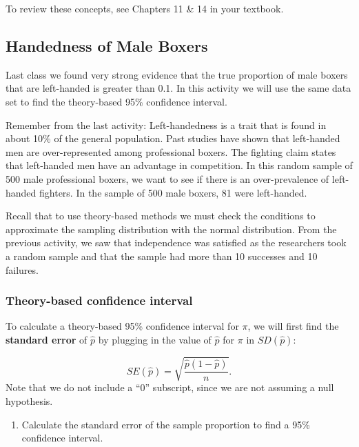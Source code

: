 \documentclass[
]{report}
\providecommand{\tightlist}{%
  \setlength{\itemsep}{0pt}\setlength{\parskip}{0pt}}
\begin{document}
To review these concepts, see Chapters 11 \& 14 in your textbook.

\hypertarget{handedness-of-male-boxers-1}{%
\subsection{Handedness of Male Boxers}\label{handedness-of-male-boxers-1}}

Last class we found very strong evidence that the true proportion of male boxers that are left-handed is greater than 0.1. In this activity we will use the same data set to find the theory-based 95\% confidence interval.

Remember from the last activity: Left-handedness is a trait that is found in about 10\% of the general population. Past studies have shown that left-handed men are over-represented among professional boxers. The fighting claim states that left-handed men have an advantage in competition. In this random sample of 500 male professional boxers, we want to see if there is an over-prevalence of left-handed fighters. In the sample of 500 male boxers, 81 were left-handed.

Recall that to use theory-based methods we must check the conditions to approximate the sampling distribution with the normal distribution. From the previous activity, we saw that independence was satisfied as the researchers took a random sample and that the sample had more than 10 successes and 10 failures.

\newpage

\hypertarget{theory-based-confidence-interval}{%
\subsubsection*{Theory-based confidence interval}\label{theory-based-confidence-interval}}

To calculate a theory-based 95\% confidence interval for \(\pi\), we will first find the \textbf{standard error} of \(\hat{p}\) by plugging in the value of \(\hat{p}\) for \(\pi\) in \(SD(\hat{p})\):

\[SE(\hat{p}) = \sqrt{\frac{\hat{p}(1-\hat{p})}{n}}.\]
Note that we do not include a ``0'' subscript, since we are not assuming a null hypothesis.

\begin{enumerate}
\def\labelenumi{\arabic{enumi}.}
\tightlist
\item
  Calculate the standard error of the sample proportion to find a 95\% confidence interval.
\end{enumerate}
\end{document}
